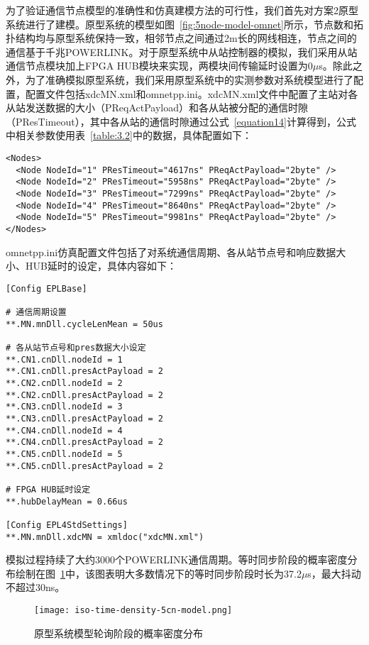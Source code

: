 为了验证通信节点模型的准确性和仿真建模方法的可行性，我们首先对方案2原型系统进行了建模。原型系统的模型如图~\ref{fig:5node-model-omnet}所示，节点数和拓扑结构均与原型系统保持一致，相邻节点之间通过2m长的网线相连，节点之间的通信基于千兆POWERLINK。对于原型系统中从站控制器的模拟，我们采用从站通信节点模块加上FPGA HUB模块来实现，两模块间传输延时设置为0$\mu$s。除此之外，为了准确模拟原型系统，我们采用原型系统中的实测参数对系统模型进行了配置，配置文件包括xdcMN.xml和omnetpp.ini。xdcMN.xml文件中配置了主站对各从站发送数据的大小（PReqActPayload）和各从站被分配的通信时隙（PResTimeout），其中各从站的通信时隙通过公式~\ref{equation14}计算得到，公式中相关参数使用表~\ref{table:3.2}中的数据，具体配置如下：
\begin{lstlisting}
<Nodes>
  <Node NodeId="1" PResTimeout="4617ns" PReqActPayload="2byte" />
  <Node NodeId="2" PResTimeout="5958ns" PReqActPayload="2byte" />
  <Node NodeId="3" PResTimeout="7299ns" PReqActPayload="2byte" />
  <Node NodeId="4" PResTimeout="8640ns" PReqActPayload="2byte" />
  <Node NodeId="5" PResTimeout="9981ns" PReqActPayload="2byte" />
</Nodes>
\end{lstlisting}

omnetpp.ini仿真配置文件包括了对系统通信周期、各从站节点号和响应数据大小、HUB延时的设定，具体内容如下：

\begin{lstlisting}
[Config EPLBase]

# 通信周期设置
**.MN.mnDll.cycleLenMean = 50us

# 各从站节点号和pres数据大小设定
**.CN1.cnDll.nodeId = 1
**.CN1.cnDll.presActPayload = 2
**.CN2.cnDll.nodeId = 2
**.CN2.cnDll.presActPayload = 2
**.CN3.cnDll.nodeId = 3
**.CN3.cnDll.presActPayload = 2
**.CN4.cnDll.nodeId = 4
**.CN4.cnDll.presActPayload = 2
**.CN5.cnDll.nodeId = 5
**.CN5.cnDll.presActPayload = 2

# FPGA HUB延时设定
**.hubDelayMean = 0.66us

[Config EPL4StdSettings]
**.MN.mnDll.xdcMN = xmldoc("xdcMN.xml")
\end{lstlisting}

模拟过程持续了大约3000个POWERLINK通信周期。等时同步阶段的概率密度分布绘制在图~\ref{fig:iso-time-density-5cn-model}中，该图表明大多数情况下的等时同步阶段时长为37.2$\mu$s，最大抖动不超过30ns。
\begin{figure}[!htb]
  \centering
  \texttt{[image: iso-time-density-5cn-model.png]}
  \caption{原型系统模型轮询阶段的概率密度分布}
  \label{fig:iso-time-density-5cn-model}
\end{figure}

